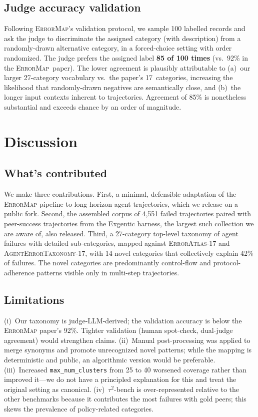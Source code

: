 \documentclass[11pt]{article}
\begin{document}
\subsection{Judge accuracy validation}

Following \textsc{ErrorMap}'s validation protocol, we sample 100
labelled records and ask the judge to discriminate the assigned
category (with description) from a randomly-drawn alternative
category, in a forced-choice setting with order randomized. The
judge prefers the assigned label \textbf{85 of 100 times} (vs.\
92\% in the \textsc{ErrorMap}~paper). The lower agreement is
plausibly attributable to (a)~our larger 27-category vocabulary vs.\
the paper's 17~categories, increasing the likelihood that
randomly-drawn negatives are semantically close, and (b)~the longer
input contexts inherent to trajectories. Agreement of 85\% is
nonetheless substantial and exceeds chance by an order of magnitude.

\section{Discussion}

\subsection{What's contributed}

We make three contributions. First, a minimal, defensible
adaptation of the \textsc{ErrorMap} pipeline to long-horizon
agent trajectories, which we release on a public fork. Second,
the assembled corpus of 4{,}551 failed trajectories paired with
peer-success trajectories from the Exgentic harness, the largest
such collection we are aware of, also released. Third, a 27-category
top-level taxonomy of agent failures with detailed sub-categories,
mapped against \textsc{ErrorAtlas}-17 and
\textsc{AgentErrorTaxonomy}-17, with 14 novel categories that
collectively explain 42\% of failures. The novel categories are
predominantly control-flow and protocol-adherence patterns
visible only in multi-step trajectories.

\subsection{Limitations}

(i)~Our taxonomy is judge-LLM-derived; the validation accuracy
is below the \textsc{ErrorMap} paper's 92\%. Tighter validation
(human spot-check, dual-judge agreement) would strengthen claims.
(ii)~Manual post-processing was applied to merge synonyms and
promote unrecognized novel patterns; while the mapping is
deterministic and public, an algorithmic version would be
preferable. (iii)~Increased \texttt{max\_num\_clusters} from 25 to
40 worsened coverage rather than improved it---we do not have a
principled explanation for this and treat the original setting as
canonical. (iv)~$\tau^2$-bench is over-represented relative to the
other benchmarks because it contributes the most failures with
gold peers; this skews the prevalence of policy-related categories.
\end{document}
